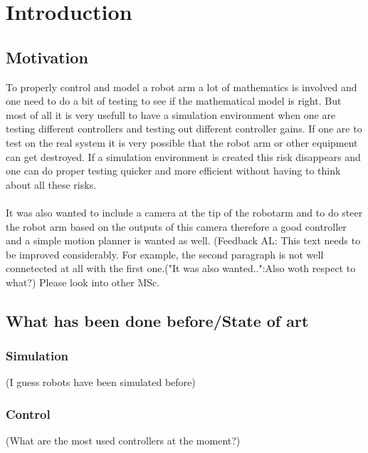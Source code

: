 \chapter{Introduction}
\section{Motivation}
To properly control and model a robot arm a lot of mathematics is involved and one need to do a bit of testing to see if the mathematical model is right. But most of all it is very usefull to have a simulation environment when one are testing different controllers and testing out different controller gains. If one are to test on the real system it is very possible that the robot arm or other equipment can get destroyed. If a simulation environment is created this risk disappears and one can do proper testing quicker and more efficient without having to think about all these risks. \\ \\
It was also wanted to include a camera at the tip of the robotarm and to do steer the robot arm based on the outputs of this camera therefore a good controller and a simple motion planner is wanted as well. 
(Feedback AL: This text needs to be improved considerably. For example, the  second paragraph is not well connetected at all with the first one.("It was also wanted..":Also woth respect to what?) Please look into other MSc. 
\section{What has been done before/State of art}
\subsection{Simulation}
(I guess robots have been simulated before)
\subsection{Control}
(What are the most used controllers at the moment?)